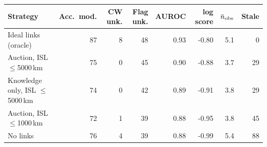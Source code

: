 \begin{tabular}{lrrrrrrr}
\toprule
Strategy & Acc.\ mod. & CW unk. & Flag unk. & AUROC & log score & $\bar n_{\rm obs}$ & Stale \\
\midrule
Ideal links (oracle) & 87 & 8 & 48 & 0.93 & -0.80 & 5.1 & 0 \\
Auction, ISL $\leq$5000\,km & 75 & 0 & 45 & 0.90 & -0.88 & 3.7 & 29 \\
Knowledge only, ISL $\leq$5000\,km & 74 & 0 & 42 & 0.89 & -0.91 & 3.8 & 29 \\
Auction, ISL $\leq$1000\,km & 72 & 1 & 39 & 0.88 & -0.95 & 3.8 & 45 \\
No links & 76 & 4 & 39 & 0.88 & -0.99 & 5.4 & 88 \\
\bottomrule
\end{tabular}
